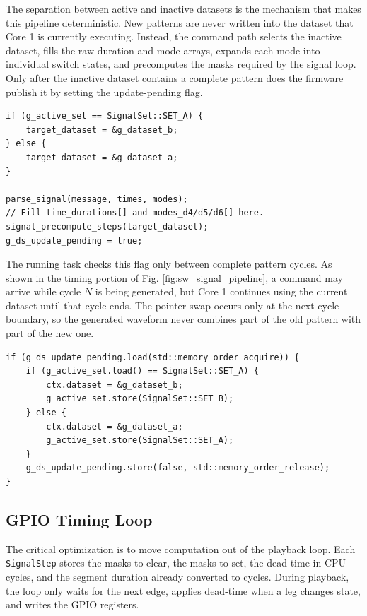 The separation between active and inactive datasets is the mechanism that makes
this pipeline deterministic. New patterns are never written into the dataset that
Core 1 is currently executing. Instead, the command path selects the inactive
dataset, fills the raw duration and mode arrays, expands each mode into individual
switch states, and precomputes the masks required by the signal loop. Only after
the inactive dataset contains a complete pattern does the firmware publish it by
setting the update-pending flag.

\begin{listing}[H]
\caption{Updating the inactive signal buffer}
\label{lst:inactive-buffer}
\begin{verbatim}
if (g_active_set == SignalSet::SET_A) {
    target_dataset = &g_dataset_b;
} else {
    target_dataset = &g_dataset_a;
}

parse_signal(message, times, modes);
// Fill time_durations[] and modes_d4/d5/d6[] here.
signal_precompute_steps(target_dataset);
g_ds_update_pending = true;
\end{verbatim}
\end{listing}

The running task checks this flag only between complete pattern cycles. As shown
in the timing portion of Fig. \ref{fig:sw_signal_pipeline}, a command may arrive
while cycle $N$ is being generated, but Core 1 continues using the current dataset
until that cycle ends. The pointer swap occurs only at the next cycle boundary, so
the generated waveform never combines part of the old pattern with part of the new
one.

\begin{listing}[H]
\caption{Cycle-boundary buffer swap}
\label{lst:buffer-swap}
\begin{verbatim}
if (g_ds_update_pending.load(std::memory_order_acquire)) {
    if (g_active_set.load() == SignalSet::SET_A) {
        ctx.dataset = &g_dataset_b;
        g_active_set.store(SignalSet::SET_B);
    } else {
        ctx.dataset = &g_dataset_a;
        g_active_set.store(SignalSet::SET_A);
    }
    g_ds_update_pending.store(false, std::memory_order_release);
}
\end{verbatim}
\end{listing}

\subsection{GPIO Timing Loop}

The critical optimization is to move computation out of the playback loop. Each
\verb|SignalStep| stores the masks to clear, the masks to set, the dead-time in CPU
cycles, and the segment duration already converted to cycles. During playback, the
loop only waits for the next edge, applies dead-time when a leg changes state, and
writes the GPIO registers.

